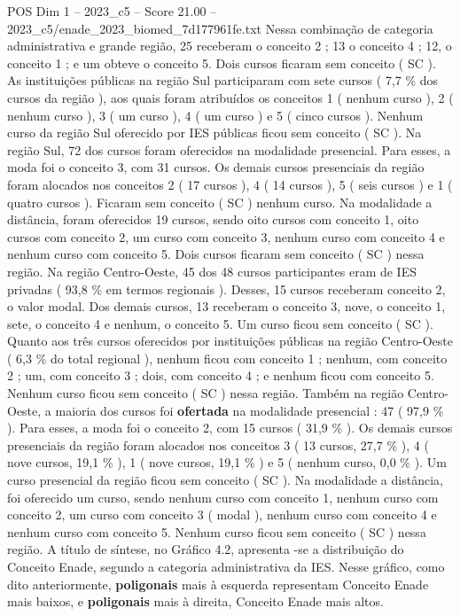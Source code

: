 \begin{textsample}{POS Dim 1 – 2023\_c5 – Score 21.00 – 2023\_c5/enade\_2023\_biomed\_7d177961fe.txt}
Nessa combinação de categoria administrativa e grande região, 25 receberam o conceito 2 ; 13 o conceito 4 ; 12, o conceito 1 ; e um obteve o conceito 5.
Dois cursos ficaram sem conceito ( SC ).
As instituições públicas na região Sul participaram com sete cursos ( 7,7 \% dos cursos da região ), aos quais foram atribuídos os conceitos 1 ( nenhum curso ), 2 ( nenhum curso ), 3 ( um curso ), 4 ( um curso ) e 5 ( cinco cursos ).
Nenhum curso da região Sul oferecido por IES públicas ficou sem conceito ( SC ).
Na região Sul, 72 dos cursos foram oferecidos na modalidade presencial.
Para esses, a moda foi o conceito 3, com 31 cursos.
Os demais cursos presenciais da região foram alocados nos conceitos 2 ( 17 cursos ), 4 ( 14 cursos ), 5 ( seis cursos ) e 1 ( quatro cursos ).
Ficaram sem conceito ( SC ) nenhum curso.
Na modalidade a distância, foram oferecidos 19 cursos, sendo oito cursos com conceito 1, oito cursos com conceito 2, um curso com conceito 3, nenhum curso com conceito 4 e nenhum curso com conceito 5.
Dois cursos ficaram sem conceito ( SC ) nessa região.
Na região Centro-Oeste, 45 dos 48 cursos participantes eram de IES privadas ( 93,8 \% em termos regionais ).
Desses, 15 cursos receberam conceito 2, o valor modal.
Dos demais cursos, 13 receberam o conceito 3, nove, o conceito 1, sete, o conceito 4 e nenhum, o conceito 5.
Um curso ficou sem conceito ( SC ).
Quanto aos três cursos oferecidos por instituições públicas na região Centro-Oeste ( 6,3 \% do total regional ), nenhum ficou com conceito 1 ; nenhum, com conceito 2 ; um, com conceito 3 ; dois, com conceito 4 ; e nenhum ficou com conceito 5.
Nenhum curso ficou sem conceito ( SC ) nessa região.
Também na região Centro-Oeste, a maioria dos cursos foi \textbf{ofertada} na modalidade presencial : 47 ( 97,9 \% ).
Para esses, a moda foi o conceito 2, com 15 cursos ( 31,9 \% ).
Os demais cursos presenciais da região foram alocados nos conceitos 3 ( 13 cursos, 27,7 \% ), 4 ( nove cursos, 19,1 \% ), 1 ( nove cursos, 19,1 \% ) e 5 ( nenhum curso, 0,0 \% ).
Um curso presencial da região ficou sem conceito ( SC ).
Na modalidade a distância, foi oferecido um curso, sendo nenhum curso com conceito 1, nenhum curso com conceito 2, um curso com conceito 3 ( modal ), nenhum curso com conceito 4 e nenhum curso com conceito 5.
Nenhum curso ficou sem conceito ( SC ) nessa região.
A título de síntese, no Gráfico 4.2, apresenta -se a distribuição do Conceito Enade, segundo a categoria administrativa da IES.
Nesse gráfico, como dito anteriormente, \textbf{poligonais} mais à esquerda representam Conceito Enade mais baixos, e \textbf{poligonais} mais à direita, Conceito Enade mais altos.

\end{textsample}
